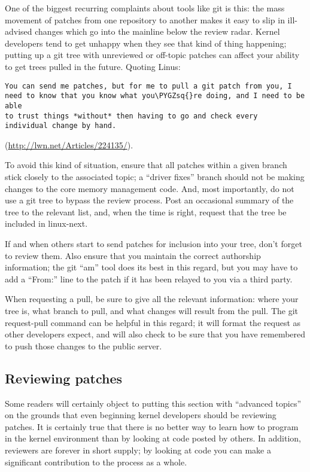 \documentclass[a4paper,8pt,english]{sphinxmanual}
\def\PYGZsq{\char`\'}
\renewcommand\PYGZsq{\textquotesingle}
\begin{document}
One of the biggest recurring complaints about tools like git is this: the
mass movement of patches from one repository to another makes it easy to
slip in ill-advised changes which go into the mainline below the review
radar.  Kernel developers tend to get unhappy when they see that kind of
thing happening; putting up a git tree with unreviewed or off-topic patches
can affect your ability to get trees pulled in the future.  Quoting Linus:

\begin{Verbatim}[commandchars=\\\{\}]
You can send me patches, but for me to pull a git patch from you, I
need to know that you know what you\PYGZsq{}re doing, and I need to be able
to trust things *without* then having to go and check every
individual change by hand.
\end{Verbatim}

(\href{http://lwn.net/Articles/224135/}{http://lwn.net/Articles/224135/}).

To avoid this kind of situation, ensure that all patches within a given
branch stick closely to the associated topic; a ``driver fixes'' branch
should not be making changes to the core memory management code.  And, most
importantly, do not use a git tree to bypass the review process.  Post an
occasional summary of the tree to the relevant list, and, when the time is
right, request that the tree be included in linux-next.

If and when others start to send patches for inclusion into your tree,
don't forget to review them.  Also ensure that you maintain the correct
authorship information; the git ``am'' tool does its best in this regard, but
you may have to add a ``From:'' line to the patch if it has been relayed to
you via a third party.

When requesting a pull, be sure to give all the relevant information: where
your tree is, what branch to pull, and what changes will result from the
pull.  The git request-pull command can be helpful in this regard; it will
format the request as other developers expect, and will also check to be
sure that you have remembered to push those changes to the public server.


\subsection{Reviewing patches}
\label{process/7.AdvancedTopics:reviewing-patches}
Some readers will certainly object to putting this section with ``advanced
topics'' on the grounds that even beginning kernel developers should be
reviewing patches.  It is certainly true that there is no better way to
learn how to program in the kernel environment than by looking at code
posted by others.  In addition, reviewers are forever in short supply; by
looking at code you can make a significant contribution to the process as a
whole.
\end{document}
